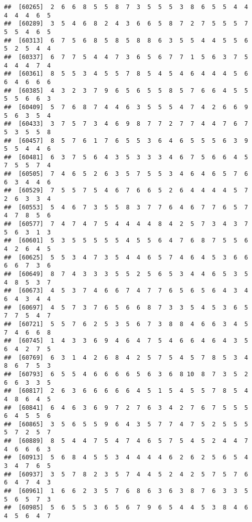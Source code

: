 \documentclass[
]{book}
\begin{document}
\begin{verbatim}
##  [60265]  2  6  6  8  5  5  8  7  3  5  5  5  3  8  6  5  5  4  4  4  4  4  6  5
##  [60289]  3  5  4  6  8  2  4  3  6  6  5  8  7  2  7  5  5  5  7  5  5  4  6  5
##  [60313]  6  7  5  6  8  5  8  5  8  8  6  3  5  5  4  4  5  5  6  5  2  5  4  4
##  [60337]  6  7  7  5  4  4  7  3  6  5  6  7  7  1  5  6  3  7  5  4  4  4  7  4
##  [60361]  8  5  5  3  4  5  5  7  8  5  4  5  4  6  4  4  4  5  6  6  4  6  6  6
##  [60385]  4  3  2  3  7  9  6  5  6  5  5  8  5  7  6  6  4  5  5  5  5  6  6  3
##  [60409]  5  7  6  8  7  4  4  6  3  5  5  5  4  7  4  2  6  6  9  5  6  3  5  4
##  [60433]  3  7  5  7  3  4  6  9  8  7  7  2  7  7  4  4  7  6  7  5  3  5  5  8
##  [60457]  8  5  7  6  1  7  6  5  5  3  6  4  6  5  5  5  6  3  9  5  5  4  4  6
##  [60481]  6  3  7  5  6  4  3  5  3  3  3  4  6  7  5  6  6  4  5  7  5  5  7  4
##  [60505]  7  4  6  5  2  6  3  5  7  5  5  3  4  6  4  6  5  7  6  6  3  4  4  6
##  [60529]  7  5  5  7  5  4  6  7  6  6  5  2  6  4  4  4  4  5  7  2  6  3  3  4
##  [60553]  5  4  6  7  3  5  5  8  3  7  7  6  4  6  7  7  6  5  7  4  7  8  5  6
##  [60577]  7  4  7  4  7  5  4  4  4  4  8  4  2  5  7  3  4  3  7  5  6  3  1  3
##  [60601]  5  3  5  5  5  5  5  4  5  5  6  4  7  6  8  7  5  5  6  4  2  6  4  5
##  [60625]  5  5  3  4  7  3  5  4  4  6  5  7  4  6  4  5  3  6  6  6  6  7  3  6
##  [60649]  8  7  4  3  3  3  5  5  2  5  6  5  3  4  4  6  5  3  5  4  8  5  3  7
##  [60673]  4  5  3  7  4  6  6  7  4  7  7  6  5  6  5  6  4  3  4  6  4  3  4  4
##  [60697]  4  5  7  3  7  6  5  6  6  8  7  3  3  5  4  5  3  6  5  7  7  5  4  7
##  [60721]  5  5  7  6  2  5  3  5  6  7  3  8  8  4  6  6  3  4  5  7  4  6  6  8
##  [60745]  1  4  3  3  6  9  4  6  4  7  5  4  6  6  4  6  4  3  5  6  4  2  7  5
##  [60769]  6  3  1  4  2  6  8  4  2  5  7  5  4  5  7  8  5  3  4  8  6  7  5  3
##  [60793]  6  5  5  4  6  6  6  6  5  6  3  6  8 10  8  7  3  5  2  6  6  3  3  5
##  [60817]  2  6  3  6  6  6  6  6  4  5  1  5  4  5  5  7  8  5  4  4  8  6  4  5
##  [60841]  6  4  6  3  6  9  7  2  7  6  3  4  2  7  6  7  5  5  5  6  4  5  5  6
##  [60865]  3  5  6  5  5  9  6  4  3  5  7  7  4  7  5  2  5  5  5  5  7  2  5  7
##  [60889]  8  5  4  4  7  5  4  7  4  6  5  7  5  4  5  2  4  4  7  4  6  6  6  3
##  [60913]  5  6  8  4  5  5  3  4  4  4  4  6  2  6  2  5  6  5  4  3  4  7  6  5
##  [60937]  3  5  7  8  2  3  5  7  4  4  5  2  4  2  5  7  5  7  6  6  4  7  4  3
##  [60961]  1  6  6  2  3  5  7  6  8  6  3  6  3  8  7  6  3  3  5  5  6  5  7  3
##  [60985]  5  6  5  5  3  6  5  6  7  9  6  5  4  4  5  3  8  4  6  4  5  6  4  7

\end{verbatim}
\end{document}
